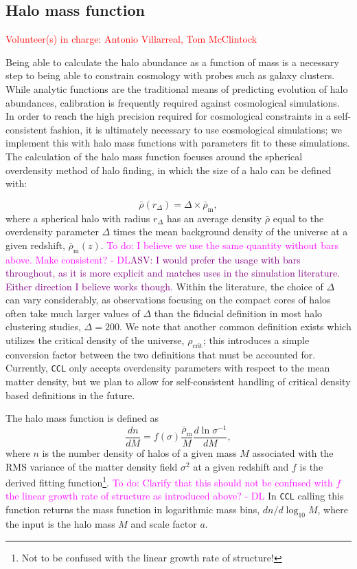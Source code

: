 \documentclass[\docopts]{\docclass}
\newcommand{\todo}[1]{\textcolor{magenta}{To do: #1}}
\newcommand{\vol}[1]{\textcolor{red}{Volunteer(s) in charge: #1}}
\newcommand{\asv}[1]{\textcolor{purple}{ASV: #1}}
\newcommand{\ccl}{{\tt CCL}\xspace}
\begin{document}
\subsection{Halo mass function}
\vol{Antonio Villarreal, Tom McClintock}

Being able to calculate the halo abundance as a function of mass is a necessary step to being able to constrain cosmology with probes such as galaxy clusters. While analytic functions are the traditional means of predicting evolution of halo abundances, calibration is frequently required against cosmological simulations. In order to reach the high precision required for cosmological constraints in a self-consistent fashion, it is ultimately necessary to use cosmological simulations; we implement this with halo mass functions with parameters fit to these simulations. The calculation of the halo mass function focuses around the spherical overdensity method of halo finding, in which the size of a halo can be defined with:

\begin{equation}
\bar{\rho}(r_{\Delta}) = \Delta \times \bar{\rho}_{\mathrm{m}},
\end{equation}
%
where a spherical halo with radius $r_{\Delta}$ has an average density $\bar{\rho}$ equal to the overdensity parameter $\Delta$ times the mean background density of the universe at a given redshift, $\bar\rho_{\mathrm{m}}(z)$. \todo{I believe we use the same quantity without bars above. Make consistent? - DL}\asv{I would prefer the usage with bars throughout, as it is more explicit and matches uses in the simulation literature. Either direction I believe works though.} Within the literature, the choice of $\Delta$ can vary considerably, as observations focusing on the compact cores of halos often take much larger values of $\Delta$ than the fiducial definition in most halo clustering studies, $\Delta = 200$. We note that another common definition exists which utilizes the critical density of the universe, $\rho_{\mathrm{crit}}$; this introduces a simple conversion factor between the two definitions that must be accounted for. Currently, \ccl only accepts overdensity parameters with respect to the mean matter density, but we plan to allow for self-consistent handling of critical density based definitions in the future.

The halo mass function is defined as
\begin{equation}
\frac{dn}{dM}=f(\sigma)\frac{\bar{\rho}_\mathrm{m}}{M}\frac{d\ln{\sigma^{-1}}}{dM},
\label{eq:halo_mass_function}
\end{equation}
where $n$ is the number density of halos of a given mass $M$ associated with the RMS variance of the matter density field $\sigma^2$ at a given redshift and $f$ is the derived fitting function\footnote{Not to be confused with the linear growth rate of structure!}. \todo{Clarify that this should not be confused with $f$ the linear growth rate of structure as introduced above? - DL}
In \ccl calling this function returns the mass function in logarithmic mass bins, $dn/d\log_{10}{M}$, where the input is the halo mass $M$ and scale factor $a$.
\end{document}
